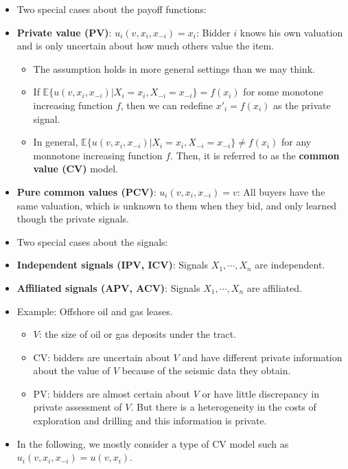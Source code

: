\documentclass[
]{book}
\providecommand{\tightlist}{%
  \setlength{\itemsep}{0pt}\setlength{\parskip}{0pt}}
\begin{document}
\begin{itemize}
\tightlist
\item
  Two special cases about the payoff functions:
\item
  \textbf{Private value (PV)}: \(u_i(v, x_i, x_{-i}) = x_i\): Bidder \(i\) knows his own valuation and is only uncertain about how much others value the item.

  \begin{itemize}
  \tightlist
  \item
    The assumption holds in more general settings than we may think.
  \item
    If \(\mathbb{E}\{u(v, x_i, x_{-i})|X_i = x_i, X_{-i} = x_{-i}\} = f(x_i)\) for some monotone increasing function \(f\), then we can redefine \(x'_i = f(x_i)\) as the private signal.
  \item
    In general, \(\mathbb{E}\{u(v, x_i, x_{-i})|X_i = x_i, X_{-i} = x_{-i}\} \neq f(x_i)\) for any monnotone increasing function \(f\). Then, it is referred to as the \textbf{common value (CV)} model.
  \end{itemize}
\item
  \textbf{Pure common values (PCV)}: \(u_i(v, x_i, x_{-i}) = v\): All buyers have the same valuation, which is unknown to them when they bid, and only learned though the private signals.
\item
  Two special cases about the signals:
\item
  \textbf{Independent signals (IPV, ICV)}: Signals \(X_1, \cdots, X_n\) are independent.
\item
  \textbf{Affiliated signals (APV, ACV)}: Signals \(X_1, \cdots, X_n\) are affiliated.
\item
  Example: Offshore oil and gas leases.

  \begin{itemize}
  \tightlist
  \item
    \(V\): the size of oil or gas deposits under the tract.
  \item
    CV: bidders are uncertain about \(V\) and have different private information about the value of \(V\) because of the seismic data they obtain.
  \item
    PV: bidders are almost certain about \(V\) or have little discrepancy in private assessment of \(V\). But there is a heterogeneity in the costs of exploration and drilling and this information is private.
  \end{itemize}
\item
  In the following, we mostly consider a type of CV model such as \(u_i(v, x_i, x_{-i}) = u(v, x_i)\).
\end{itemize}
\end{document}
